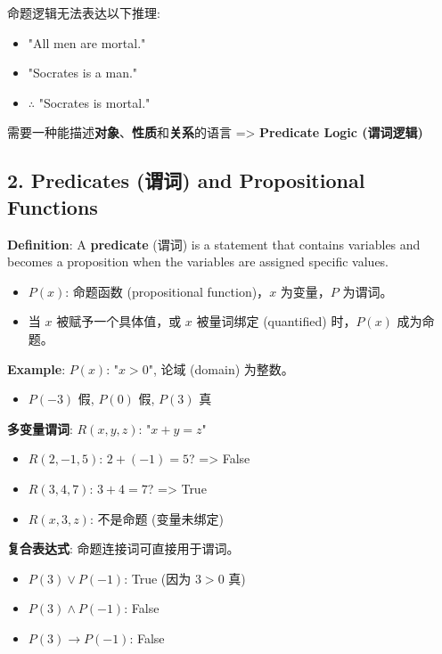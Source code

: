 \documentclass[10pt,a4paper,openany]{ctexbook}
\theoremstyle{definition}
\theoremstyle{remark}
\begin{document}
命题逻辑无法表达以下推理:
\begin{itemize}
\item "All men are mortal."
\item "Socrates is a man."
\item $\therefore$ "Socrates is mortal."

\end{itemize}

需要一种能描述\textbf{对象}、\textbf{性质}和\textbf{关系}的语言 => \textbf{Predicate Logic (谓词逻辑)}
\vspace{-2pt}

\subsection{2. Predicates (谓词) and Propositional Functions}

\textbf{Definition}: A \textbf{predicate} (谓词) is a statement that contains variables and becomes a proposition when the variables are assigned specific values.
\begin{itemize}
\item $P(x)$: 命题函数 (propositional function)，$x$ 为变量，$P$ 为谓词。
\item 当 $x$ 被赋予一个具体值，或 $x$ 被量词绑定 (quantified) 时，$P(x)$ 成为命题。

\end{itemize}

\textbf{Example}: $P(x)$: "$x > 0$", 论域 (domain) 为整数。
\begin{itemize}
\item $P(-3)$ 假, $P(0)$ 假, $P(3)$ 真

\end{itemize}

\textbf{多变量谓词}: $R(x, y, z)$: "$x + y = z$"
\begin{itemize}
\item $R(2,-1,5)$: $2 + (-1) = 5$? => False
\item $R(3,4,7)$: $3 + 4 = 7$? => True
\item $R(x, 3, z)$: 不是命题 (变量未绑定)

\end{itemize}

\textbf{复合表达式}: 命题连接词可直接用于谓词。
\begin{itemize}
\item $P(3) \lor P(-1)$: True (因为 $3>0$ 真)
\item $P(3) \land P(-1)$: False
\item $P(3) \to P(-1)$: False

\end{itemize}
\end{document}
